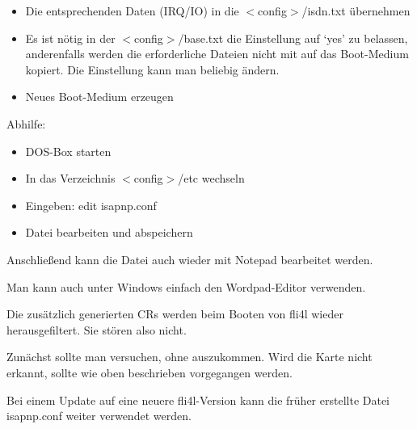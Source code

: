 \begin{itemize}
  \item Die entsprechenden Daten (IRQ/IO) in die $<$config$>$/isdn.txt
    übernehmen
  \item Es ist nötig in der $<$config$>$/base.txt die 
    Einstellung auf `yes' zu belassen, anderenfalls werden die erforderliche
    Dateien nicht mit auf das Boot-Medium kopiert. Die Einstellung
     kann man beliebig ändern.
  \item Neues Boot-Medium erzeugen
  \end{itemize}

  Abhilfe:
  \begin{itemize}
  \item DOS-Box starten
  \item In das Verzeichnis $<$config$>$/etc wechseln
  \item Eingeben:
    edit isapnp.conf
  \item Datei bearbeiten und abspeichern
  \end{itemize}
  Anschließend kann die Datei auch wieder mit Notepad bearbeitet
  werden.

  Man kann auch unter Windows einfach den Wordpad-Editor verwenden.

  Die zusätzlich generierten CRs werden beim Booten von fli4l wieder
  herausgefiltert. Sie stören also nicht.

  Zunächst sollte man versuchen, ohne  auszukommen. Wird die
  Karte nicht erkannt, sollte wie oben beschrieben vorgegangen werden.

  Bei einem Update auf eine neuere fli4l-Version kann die früher
  erstellte Datei \hbox{isapnp.conf} weiter verwendet werden.

